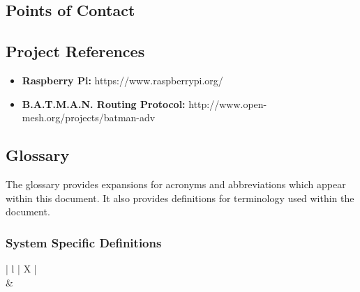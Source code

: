 \documentclass[11pt,a4paper]{article}
\begin{document}
\subsection{Points of Contact}


\subsection{Project References}
\begin{itemize}
	\item{\textbf{Raspberry Pi:}}
		\textnormal{https://www.raspberrypi.org/}
	\item{\textbf{B.A.T.M.A.N. Routing Protocol:}}
		\textnormal{http://www.open-mesh.org/projects/batman-adv}
\end{itemize}

\subsection{Glossary}
The glossary provides expansions for acronyms and abbreviations which appear within this document. It also provides definitions for terminology used within the document. 

\subsubsection{System Specific Definitions}
\begin{center}
\begin{tabularx}{\textwidth}{ | l | X | }
	\hline
	 \\
	\hline
		& \\
	\hline
\end{tabularx}
\end{center}
\end{document}
